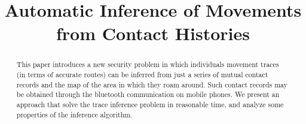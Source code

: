 \documentclass{sig-alternate-10pt}
\begin{document}
%

\title{Automatic Inference of Movements from Contact Histories}

%
\author{
%
%
}


\maketitle
\begin{abstract}
This paper introduces a new security problem in which individuals movement
traces (in terms of accurate routes) can be inferred from just a
series of mutual contact records and the map of the area in which
they roam around. Such contact records may be obtained through
the bluetooth communication on mobile phones.
We present an approach that solve the trace inference problem
in reasonable time, and analyze some properties of the inference algorithm.
\end{abstract}
\end{document}
